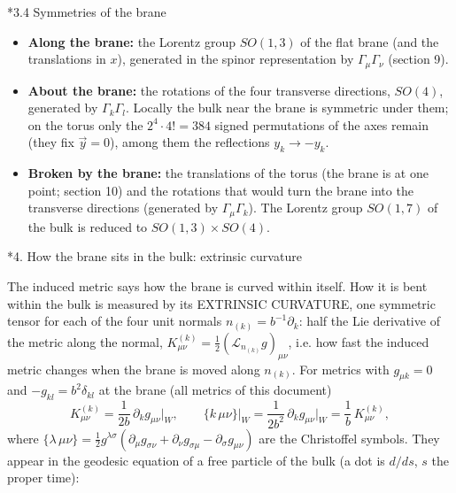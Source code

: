 \documentclass[10pt,a4paper]{article}
\makeatletter
\renewcommand\section{\@startsection{section}{1}{\z@}{-3.5ex \@plus -1ex \@minus -.2ex}{2.3ex \@plus.2ex}{\normalfont\Large\bfseries\raggedright}}
\renewcommand\subsection{\@startsection{subsection}{2}{\z@}{-3.25ex\@plus -1ex \@minus -.2ex}{1.5ex \@plus .2ex}{\normalfont\large\bfseries\raggedright}}
\makeatother
\begin{document}
\subsection*{3.4 Symmetries of the brane}
\begin{itemize}
\item \textbf{Along the brane:} the Lorentz group $SO(1,3)$ of the flat brane (and the translations in $x$), generated in the spinor representation by $\Gamma_\mu\Gamma_\nu$ (section 9).
\item \textbf{About the brane:} the rotations of the four transverse directions, $SO(4)$, generated by $\Gamma_k\Gamma_l$. Locally the bulk near the brane is symmetric under them; on the torus only the $2^4\cdot4!=384$ signed permutations of the axes remain (they fix $\vec y=0$), among them the reflections $y_k\to-y_k$.
\item \textbf{Broken by the brane:} the translations of the torus (the brane is at one point; section 10) and the rotations that would turn the brane into the transverse directions (generated by $\Gamma_\mu\Gamma_k$). The Lorentz group $SO(1,7)$ of the bulk is reduced to $SO(1,3)\times SO(4)$.
\end{itemize}
\section*{4. How the brane sits in the bulk: extrinsic curvature}
The induced metric says how the brane is curved within itself. How it is bent within the bulk is measured by its EXTRINSIC CURVATURE, one symmetric tensor for each of the four unit normals $n_{(k)}=b^{-1}\partial_k$: half the Lie derivative of the metric along the normal, $K^{(k)}_{\mu\nu}=\frac12(\mathcal L_{n_{(k)}}g)_{\mu\nu}$, i.e. how fast the induced metric changes when the brane is moved along $n_{(k)}$. For metrics with $g_{\mu k}=0$ and $-g_{kl}=b^2\delta_{kl}$ at the brane (all metrics of this document)
\begin{equation*}
K^{(k)}_{\mu\nu}=\frac1{2b}\,\partial_kg_{\mu\nu}\Big|_W,\qquad \{k\,\mu\nu\}\Big|_W=\frac1{2b^2}\,\partial_kg_{\mu\nu}\Big|_W=\frac1b\,K^{(k)}_{\mu\nu},
\end{equation*}
where $\{\lambda\,\mu\nu\}=\frac12g^{\lambda\sigma}(\partial_\mu g_{\sigma\nu}+\partial_\nu g_{\sigma\mu}-\partial_\sigma g_{\mu\nu})$ are the Christoffel symbols. They appear in the geodesic equation of a free particle of the bulk (a dot is $d/ds$, $s$ the proper time):
\end{document}
